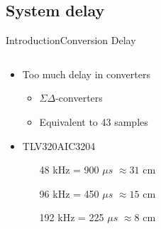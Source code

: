 \subsection{System delay}
\begin{frame}{Introduction}{Conversion Delay}
	\begin{columns}
		\begin{column}{0.4\textwidth}
		\begin{itemize}
		\item Too much delay in converters
				\begin{itemize}
				\item $\Sigma \Delta$-converters
				\item Equivalent to 43 samples						
				\end{itemize}
		\item TLV320AIC3204
				\begin{itemize}
				\item[\textcolor{MATLABred}{48 kHz}]= 900 $\mu s$ $\approx 31$ cm
				\item[\textcolor{MATLAByellow}{96 kHz}]= 450 $\mu s$ $\approx 15$ cm
				\item[\textcolor{MATLABpurple}{192 kHz}]= 225 $\mu s$ $\approx 8$ cm
				\end{itemize}	
		\end{itemize}
		\end{column}
		\begin{column}{0.6\textwidth} 
		\begin{center}
		
		\end{center}
		\end{column}
	\end{columns}
\end{frame}

